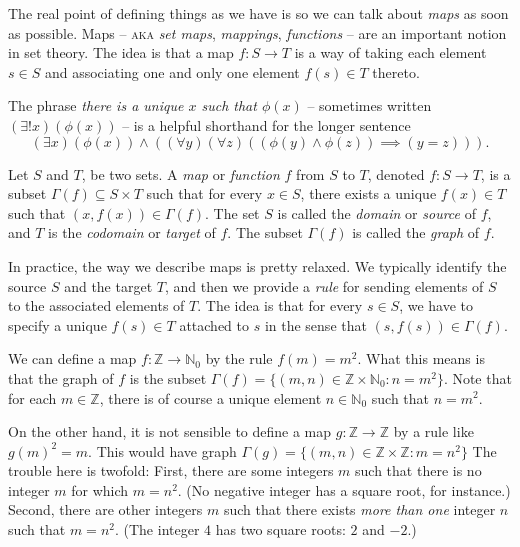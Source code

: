 \documentclass[11pt,dvipsnames]{book}
\numberwithin{figure}{section} %
\numberwithin{table}{section} %
\begin{document}
The real point of defining things as we have is so we can talk about \emph{maps} as soon as possible.
Maps -- \textsc{aka} \emph{set maps}, \emph{mappings}, \emph{functions} -- are an important notion in set theory.
The idea is that a map $f\colon S \to T$ is a way of taking each element $s\in S$ and associating one and only one element $f(s)\in T$ thereto.

The phrase \emph{there is a unique $x$ such that $\phi(x)$} -- sometimes written $(\exists ! x)(\phi(x))$ -- is a helpful shorthand for the longer sentence
\[
	(\exists x)(\phi(x)) \wedge ((\forall y)(\forall z)((\phi(y)\wedge \phi(z))\implies(y=z))).
\]

\begin{definition}
Let $S$ and $T$, be two sets.
A \emph{map} or \emph{function} $f$ from $S$ to $T$, denoted $f\colon S\to T$, is a subset $\Gamma(f) \subseteq S \times T$ such that for every $x \in S$, there exists a unique $f(x) \in T$ such that $(x,f(x)) \in \Gamma(f)$.
The set $S$ is called the {\it domain} or \emph{source} of $f$, and $T$ is the {\it codomain} or \emph{target} of $f$. The subset $\Gamma(f)$ is called the \emph{graph} of $f$.
\end{definition}

In practice, the way we describe maps is pretty relaxed.
We typically identify the source $S$ and the target $T$, and
then we provide a \emph{rule} for sending elements of $S$ to the associated elements of $T$.
The idea is that for every $ s \in S$, we have to specify a unique $f(s) \in T$ attached to $s$ in the sense that $(s, f(s)) \in \Gamma(f)$.

\begin{example}
We can define a map $f \colon \mathbb{Z}\rightarrow \mathbb{N}_0$ by the rule $f(m)=m^2$.
What this means is that the graph of $f$ is the subset $\Gamma(f) = \{(m,n) \in \mathbb{Z}\times\mathbb{N}_0 : n = m^2\}$.
Note that for each $m \in \mathbb{Z}$, there is of course a unique element $n \in \mathbb{N}_0$ such that $n=m^2$.

On the other hand, it is not sensible to define a map $ g \colon \mathbb{Z} \to \mathbb{Z}$ by a rule like $g(m)^2 = m$.
This would have graph $\Gamma(g) = \{(m,n) \in \mathbb{Z}\times\mathbb{Z} : m = n^2\}$
The trouble here is twofold:
First, there are some integers $m$ such that there is no integer $m$ for which $m = n^2$. (No negative integer has a square root, for instance.)
Second, there are other integers $m$ such that there exists \emph{more than one} integer $n$ such that $m = n^2$. (The integer $4$ has two square roots: $2$ and $-2$.)
\end{example}
\end{document}
